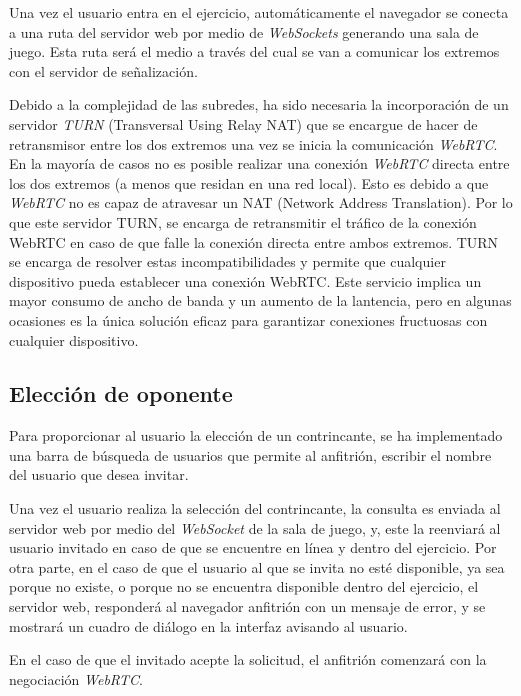 \documentclass[a4paper, 12pt]{book}
\begin{document}
Una vez el usuario entra en el ejercicio, automáticamente el navegador se conecta a una ruta del servidor web por medio de \emph{WebSockets} generando una sala de juego. Esta ruta será el medio a través del cual se van a comunicar los extremos con el servidor de señalización.

Debido a la complejidad de las subredes, ha sido necesaria la incorporación de un servidor \emph{TURN} (Transversal Using Relay NAT) que se encargue de hacer de retransmisor entre los dos extremos una vez se inicia la comunicación \emph{WebRTC}. En la mayoría de casos no es posible realizar una conexión \emph{WebRTC} directa entre los dos extremos (a menos que residan en una red local). Esto es debido a que \emph{WebRTC} no es capaz de atravesar un NAT (Network Address Translation). Por lo que este servidor TURN, se encarga de retransmitir el tráfico de la conexión WebRTC en caso de que falle la conexión directa entre ambos extremos. TURN se encarga de resolver estas incompatibilidades y permite que cualquier dispositivo pueda establecer una conexión WebRTC. Este servicio implica un mayor consumo de ancho de banda y un aumento de la lantencia, pero en algunas ocasiones es la única solución eficaz para garantizar conexiones fructuosas con cualquier dispositivo.

\subsection{Elección de oponente}
\label{sec:follow_line_game_sync_oponente_chat}

Para proporcionar al usuario la elección de un contrincante, se ha implementado una barra de búsqueda de usuarios que permite al anfitrión, escribir el nombre del usuario que desea invitar.

Una vez el usuario realiza la selección del contrincante, la consulta es enviada al servidor web por medio del \emph{WebSocket} de la sala de juego, y, este la reenviará al usuario invitado en caso de que se encuentre en línea y dentro del ejercicio. Por otra parte, en el caso de que el usuario al que se invita no esté disponible, ya sea porque no existe, o porque no se encuentra disponible dentro del ejercicio, el servidor web, responderá al navegador anfitrión con un mensaje de error, y se mostrará un cuadro de diálogo en la interfaz avisando al usuario.

En el caso de que el invitado acepte la solicitud, el anfitrión comenzará con la negociación \emph{WebRTC}. 
\end{document}
